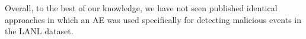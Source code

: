 \documentclass[sigconf]{acmart}
\begin{document}
Overall, to the best of our knowledge, we have not seen published identical approaches in which an AE was used specifically for detecting malicious events in the LANL dataset. 


\begin{figure}[htbp]
\centering
\setlength{\lineskip}{\medskipamount}
\hfill
{}\hfill

\end{figure}
\end{document}
